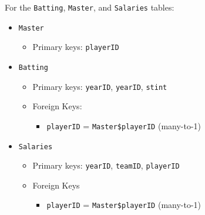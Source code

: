 \documentclass[]{book}
\providecommand{\tightlist}{%
  \setlength{\itemsep}{0pt}\setlength{\parskip}{0pt}}
\theoremstyle{plain}
\theoremstyle{remark}
\theoremstyle{definition}
\theoremstyle{definition}
\theoremstyle{definition}
\theoremstyle{remark}
\begin{document}
For the \texttt{Batting}, \texttt{Master}, and \texttt{Salaries} tables:

\begin{itemize}
\item
  \texttt{Master}

  \begin{itemize}
  \tightlist
  \item
    Primary keys: \texttt{playerID}
  \end{itemize}
\item
  \texttt{Batting}

  \begin{itemize}
  \item
    Primary keys: \texttt{yearID}, \texttt{yearID}, \texttt{stint}
  \item
    Foreign Keys:

    \begin{itemize}
    \tightlist
    \item
      \texttt{playerID} = \texttt{Master\$playerID} (many-to-1)
    \end{itemize}
  \end{itemize}
\item
  \texttt{Salaries}

  \begin{itemize}
  \item
    Primary keys: \texttt{yearID}, \texttt{teamID}, \texttt{playerID}
  \item
    Foreign Keys

    \begin{itemize}
    \tightlist
    \item
      \texttt{playerID} = \texttt{Master\$playerID} (many-to-1)
    \end{itemize}
  \end{itemize}
\end{itemize}
\end{document}
